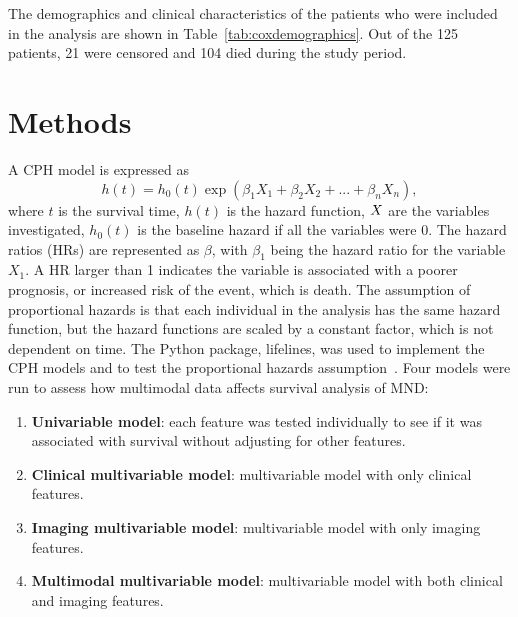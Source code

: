The demographics and clinical characteristics of the patients who were included in the analysis are shown in Table~\ref{tab:coxdemographics}.
Out of the 125 patients, 21 were censored and 104 died during the study period.

\section{Methods}

A CPH model is expressed as
\begin{equation}\label{eq:coxhazard}
    h(t) = h_0(t) \exp{(\beta_1 X_1 + \beta_2 X_2 + ... + \beta_n X_n)},
\end{equation}
where $t$ is the survival time, $h(t)$ is the hazard function, $\boldmath{X}$ are the variables investigated, $h_0(t)$ is the baseline hazard if all the variables were 0.
The hazard ratios (HRs) are represented as $\beta$, with $\beta_1$ being the hazard ratio for the variable $X_1$.
A HR larger than 1 indicates the variable is associated with a poorer prognosis, or increased risk of the event, which is death.
The assumption of proportional hazards is that each individual in the analysis has the same hazard function, but the hazard functions are scaled by a constant factor, which is not dependent on time.
The Python package, lifelines, was used to implement the CPH models and to test the proportional hazards assumption~\cite{davidson-pilonLifelinesSurvivalAnalysis2019}.
Four models were run to assess how multimodal data affects survival analysis of MND:
\begin{enumerate}
\setlength\itemsep{-0.5em}
    \item \textbf{Univariable model}: each feature was tested individually to see if it was associated with survival without adjusting for other features.
    \item \textbf{Clinical multivariable model}: multivariable model with only clinical features.
    \item \textbf{Imaging multivariable model}: multivariable model with only imaging features.
    \item \textbf{Multimodal multivariable model}: multivariable model with both clinical and imaging features.
\end{enumerate}


